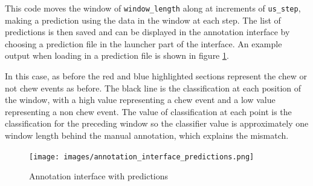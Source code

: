 This code moves the window of \texttt{window\_length} along at increments of \texttt{us\_step}, making a prediction using the data in the window at each step. The list of predictions is then saved and can be displayed in the annotation interface by choosing a prediction file in the launcher part of the interface. An example output when loading in a prediction file is shown in figure \ref{interfaceprediction}.

In this case, as before the red and blue highlighted sections represent the chew or not chew events as before. The black line is the classification at each position of the window, with a high value representing a chew event and a low value representing a non chew event. The value of classification at each point is the classification for the preceding window so the classifier value is approximately one window length behind the manual annotation, which explains the mismatch.

\begin{figure}[ht!]
\begin{center}
\leavevmode
\texttt{[image: images/annotation\_interface\_predictions.png]}
\end{center}
\caption{Annotation interface with predictions}
\label{interfaceprediction}
\end{figure}




